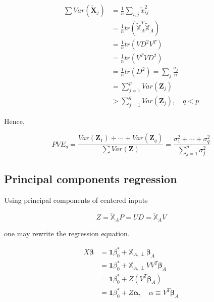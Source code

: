 \documentclass[]{book}
\theoremstyle{definition}
\theoremstyle{definition}
\theoremstyle{definition}
\theoremstyle{remark}
\begin{document}
\begin{equation*}
  \begin{split}
    \sum Var(\widetilde{\mathbf{X}}_j) & = \frac{1}{n} \sum_{i, j} \widetilde{x}_{ij}^2 \\
    & = \frac{1}{n} tr(\widetilde{\mathbb{X}}_A^T \widetilde{\mathbb{X}}_A) \\
    & = \frac{1}{n} tr(VD^2 V^T) \\
    & = \frac{1}{n} tr(V^T V D^2) \\
    & = \frac{1}{n} tr(D^2) = \sum_j \frac{\sigma_j}{n} \\
    & = \sum_{j = 1}^p Var(\mathbf{Z}_j) \\
    & > \sum_{j = 1}^q Var(\mathbf{Z}_j), \quad q < p
  \end{split}
\end{equation*}

Hence,

\[PVE_q = \frac{Var(\mathbf{Z}_1) + \cdots + Var(\mathbf{Z}_q)}{\sum Var(\mathbf{Z})} = \frac{\sigma_1^2 + \cdots + \sigma_q^2}{\sum\limits_{j = 1}^p \sigma_j^2}\]

\hypertarget{principal-components-regression}{%
\subsection{Principal components regression}\label{principal-components-regression}}

Using principal components of centered inputs

\[Z = \widetilde{\mathbb{X}}_A P = UD = \widetilde{\mathbb{X}}_A V\]

one may rewrite the regression equation.

\begin{equation}
  \begin{split}
    X \boldsymbol\beta& = \mathbf{1} \beta_0^{\ast} + \mathbb{X}_{A, \perp} \boldsymbol\beta_{A} \\
    & = \mathbf{1} \beta_0^{\ast} + \mathbb{X}_{A, \perp} V V^T \boldsymbol\beta_{A} \\
    & = \mathbf{1} \beta_0^{\ast} + Z (V^T \boldsymbol\beta_{A}) \\
    & = \mathbf{1} \beta_0^{\ast} + Z \boldsymbol\alpha, \quad \alpha \equiv V^T \boldsymbol\beta_{A} \\
  \end{split}
  \label{eq:pcrmeanres}
\end{equation}
\end{document}
